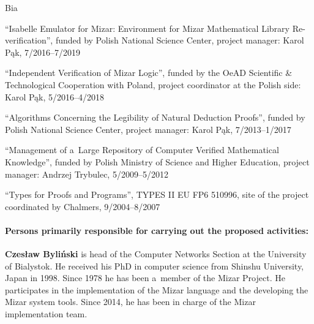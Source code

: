 \begin{sitedescription}{Bia}
\begin{compactitem}
\item ``Isabelle Emulator for Mizar: Environment for Mizar Mathematical Library Re-verification'',
funded by Polish National Science Center, project manager: Karol Pąk, 7/2016--7/2019
\item ``Independent Verification of Mizar Logic'', funded by the OeAD Scientific \& Technological Cooperation with Poland,
project coordinator at the Polish side: Karol Pąk, 5/2016--4/2018
\item ``Algorithms Concerning the Legibility of Natural Deduction Proofs'', funded by Polish National Science Center,
project manager: Karol Pąk, 7/2013--1/2017
\item ``Management of a~Large Repository of Computer Verified Mathematical Knowledge'',
funded by Polish Ministry of Science and Higher Education, project manager: Andrzej Trybulec, 5/2009--5/2012
\item ``Types for Proofs and Programs'', TYPES II EU FP6 510996,
site of the project coordinated by Chalmers, 9/2004--8/2007
\end{compactitem}



\paragraph{Persons primarily responsible for carrying out the proposed activities:}

\begin{compactitem}

\item\textbf{Czesław Byliński} is head of the Computer Networks Section at the University of Bialystok.
He received his PhD in computer science from Shinshu University, Japan in 1998.
Since 1978 he has been a~member of the Mizar Project.
He participates in the implementation of the Mizar language and the developing the Mizar system tools. 
Since 2014, he has been in charge of the Mizar implementation team.


\end{compactitem}
\end{sitedescription}
